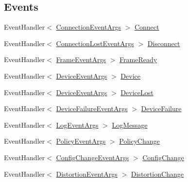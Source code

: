 \subsection*{Events}
\begin{DoxyCompactItemize}
\item 
Event\+Handler$<$ \mbox{\hyperlink{class_leap_1_1_connection_event_args}{Connection\+Event\+Args}} $>$ \mbox{\hyperlink{interface_leap_1_1_i_controller_a501a0d790157763790a9088e295d889e}{Connect}}
\item 
Event\+Handler$<$ \mbox{\hyperlink{class_leap_1_1_connection_lost_event_args}{Connection\+Lost\+Event\+Args}} $>$ \mbox{\hyperlink{interface_leap_1_1_i_controller_a628fffe087c34d18582c2ed6f6a47ce8}{Disconnect}}
\item 
Event\+Handler$<$ \mbox{\hyperlink{class_leap_1_1_frame_event_args}{Frame\+Event\+Args}} $>$ \mbox{\hyperlink{interface_leap_1_1_i_controller_ab0ab6d34b37133ecd8d4a4dfb67d2de0}{Frame\+Ready}}
\item 
Event\+Handler$<$ \mbox{\hyperlink{class_leap_1_1_device_event_args}{Device\+Event\+Args}} $>$ \mbox{\hyperlink{interface_leap_1_1_i_controller_a06a0872cb73a447a2a278ade153445cc}{Device}}
\item 
Event\+Handler$<$ \mbox{\hyperlink{class_leap_1_1_device_event_args}{Device\+Event\+Args}} $>$ \mbox{\hyperlink{interface_leap_1_1_i_controller_acebdfe34ac0a49f4fc045321cdad1a8f}{Device\+Lost}}
\item 
Event\+Handler$<$ \mbox{\hyperlink{class_leap_1_1_device_failure_event_args}{Device\+Failure\+Event\+Args}} $>$ \mbox{\hyperlink{interface_leap_1_1_i_controller_a6ea9036d16ee4555db83da6a41ce3802}{Device\+Failure}}
\item 
Event\+Handler$<$ \mbox{\hyperlink{class_leap_1_1_log_event_args}{Log\+Event\+Args}} $>$ \mbox{\hyperlink{interface_leap_1_1_i_controller_a408bbe35d7b05fb91b3f9a7ceb1b68aa}{Log\+Message}}
\item 
Event\+Handler$<$ \mbox{\hyperlink{class_leap_1_1_policy_event_args}{Policy\+Event\+Args}} $>$ \mbox{\hyperlink{interface_leap_1_1_i_controller_acbcab217190984328912af3babced005}{Policy\+Change}}
\item 
Event\+Handler$<$ \mbox{\hyperlink{class_leap_1_1_config_change_event_args}{Config\+Change\+Event\+Args}} $>$ \mbox{\hyperlink{interface_leap_1_1_i_controller_a1a058aa83e4702e93195523f67b6b688}{Config\+Change}}
\item 
Event\+Handler$<$ \mbox{\hyperlink{class_leap_1_1_distortion_event_args}{Distortion\+Event\+Args}} $>$ \mbox{\hyperlink{interface_leap_1_1_i_controller_ae24e6374255a48c587c932f9b083c612}{Distortion\+Change}}

\end{DoxyCompactItemize}
